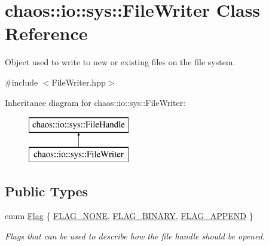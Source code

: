 \hypertarget{classchaos_1_1io_1_1sys_1_1_file_writer}{\section{chaos\-:\-:io\-:\-:sys\-:\-:File\-Writer Class Reference}
\label{classchaos_1_1io_1_1sys_1_1_file_writer}
}


Object used to write to new or existing files on the file system.  




{\ttfamily \#include $<$File\-Writer.\-hpp$>$}

Inheritance diagram for chaos\-:\-:io\-:\-:sys\-:\-:File\-Writer\-:\begin{figure}[H]
\begin{center}
\leavevmode
\includegraphics[height=2.000000cm]{classchaos_1_1io_1_1sys_1_1_file_writer}
\end{center}
\end{figure}
\subsection*{Public Types}
\begin{DoxyCompactItemize}
\item 
enum \hyperlink{classchaos_1_1io_1_1sys_1_1_file_writer_aafcaef6dd3171373d8dfadadcc3c1b0b}{Flag} \{ \hyperlink{classchaos_1_1io_1_1sys_1_1_file_writer_aafcaef6dd3171373d8dfadadcc3c1b0bab1c0f867f11da4ed8678148548fa9458}{F\-L\-A\-G\-\_\-\-N\-O\-N\-E}, 
\hyperlink{classchaos_1_1io_1_1sys_1_1_file_writer_aafcaef6dd3171373d8dfadadcc3c1b0baf46420535aaf1e5a6cf757485acaa2bc}{F\-L\-A\-G\-\_\-\-B\-I\-N\-A\-R\-Y}, 
\hyperlink{classchaos_1_1io_1_1sys_1_1_file_writer_aafcaef6dd3171373d8dfadadcc3c1b0ba2e28c6095d07cd49bee60edfcb9c4ec8}{F\-L\-A\-G\-\_\-\-A\-P\-P\-E\-N\-D}
 \}
\begin{DoxyCompactList}\small\item\em Flags that can be used to describe how the file handle should be opened. \end{DoxyCompactList}\end{DoxyCompactItemize}
